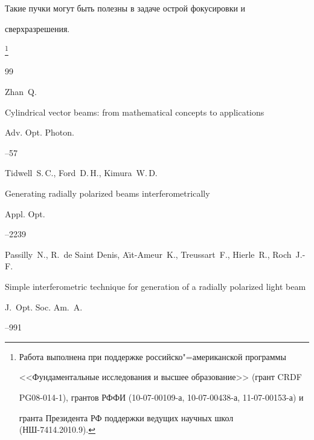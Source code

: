 Такие пучки могут быть полезны в задаче острой фокусировки и

сверхразрешения.



\thanks{Работа выполнена при поддержке российско"=американской программы

<<Фундаментальные исследования и высшее образование>> (грант CRDF

PG08-014-1), грантов РФФИ (10-07-00109-а, 10-07-00438-а, 11-07-00153-а) и

гранта Президента РФ поддержки ведущих научных школ (НШ-7414.2010.9).}



\begin{thebibliography}{99}




\by Zhan~Q.

\paper Cylindrical vector beams: from mathematical concepts to applications

\jour Adv. Opt. Photon.




--57




\by Tidwell~S.\,C., Ford~D.\,H., Kimura~W.\,D.

\paper Generating radially polarized beams interferometrically

\jour Appl. Opt.




--2239




\by Passilly~N., R.~de Saint Denis, A\"{\i}t-Ameur~K., Treussart~F., Hierle~R., Roch~J.-F.

\paper Simple interferometric technique for generation of a radially polarized light beam

\jour J.~Opt. Soc. Am.~A.




--991





\end{thebibliography}
